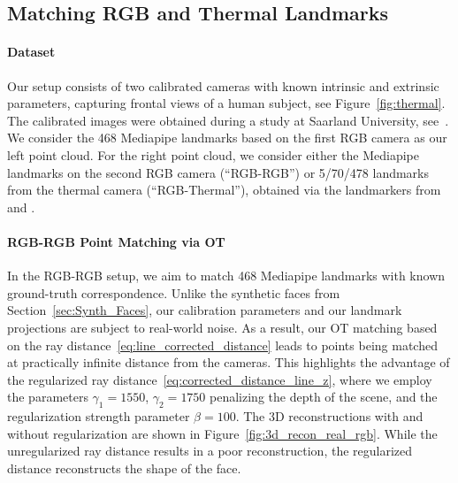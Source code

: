 \documentclass[10pt, twocolumn]{article}
\theoremstyle{definition}
\begin{document}
\subsection{Matching RGB and Thermal Landmarks} \label{sec:realworld}

\paragraph*{Dataset}
Our setup consists of two calibrated cameras with known intrinsic and extrinsic parameters,
capturing frontal views of a human subject, see Figure~\ref{fig:thermal}. The calibrated images were obtained during a study at Saarland University, see~\cite{flotho2021multimodal,flotho2023lagrangian}. We consider the 468 Mediapipe landmarks \cite{lugaresi2019mediapipe} based on the first RGB camera as our left point cloud.
For the right point cloud, we consider either the Mediapipe landmarks on the second RGB camera (\enquote{RGB-RGB}) or 5/70/478 landmarks from the thermal camera (\enquote{RGB-Thermal}), obtained via the landmarkers from \cite{flotho2025t} and \cite{TFW}.

\paragraph*{RGB-RGB Point Matching via OT}
In the RGB-RGB setup, we aim to match 468 Mediapipe landmarks with known ground-truth correspondence. Unlike the synthetic faces from Section~\ref{sec:Synth_Faces}, our calibration parameters and our landmark projections are subject to real-world noise. As a result, our OT matching 
based on the ray distance~\eqref{eq:line_corrected_distance} leads to points being matched at practically infinite distance from the cameras. This highlights the advantage of the regularized ray distance~\eqref{eq:corrected_distance_line_z}, where we employ the parameters $\gamma_1 = 1550$, $\gamma_2 = 1750$ penalizing the depth of the scene, and the regularization strength parameter $\beta = 100$. 
The 3D reconstructions with and without regularization are shown in Figure~\ref{fig:3d_recon_real_rgb}. While the unregularized ray distance results in a poor reconstruction, the regularized distance {reconstructs the shape of the face}. 
\end{document}
